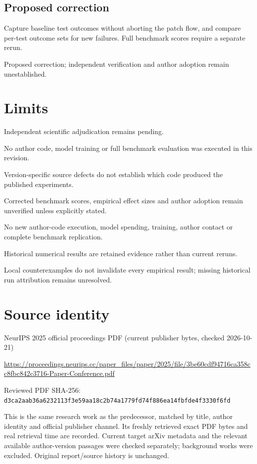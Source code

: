 \documentclass[11pt]{article}
\begin{document}
\subsection*{Proposed correction}

Capture baseline test outcomes without aborting the patch flow, and compare per-test outcome sets for new failures. Full benchmark scores require a separate rerun.

Proposed correction; independent verification and author adoption remain unestablished.

\section*{Limits}

Independent scientific adjudication remains pending.\par

No author code, model training or full benchmark evaluation was executed in this revision.\par

Version-specific source defects do not establish which code produced the published experiments.\par

Corrected benchmark scores, empirical effect sizes and author adoption remain unverified unless explicitly stated.\par

No new author-code execution, model spending, training, author contact or complete benchmark replication.\par

Historical numerical results are retained evidence rather than current reruns.\par

Local counterexamples do not invalidate every empirical result; missing historical run attribution remains unresolved.\par

\section*{Source identity}

NeurIPS 2025 official proceedings PDF (current publisher bytes, checked 2026-10-21)

\url{https://proceedings.neurips.cc/paper_files/paper/2025/file/3be60cdf94716ca358cc8fbc842c3716-Paper-Conference.pdf}

Reviewed PDF SHA-256: \nolinkurl{d3ca2aab36a6232113f3e59aa18c2b74a1779fd74f886ea14fbfde4f3330f6fd}

This is the same research work as the predecessor, matched by title, author identity and official publisher channel. Its freshly retrieved exact PDF bytes and real retrieval time are recorded. Current target arXiv metadata and the relevant available author-version passages were checked separately; background works were excluded. Original report/source history is unchanged.
\end{document}
